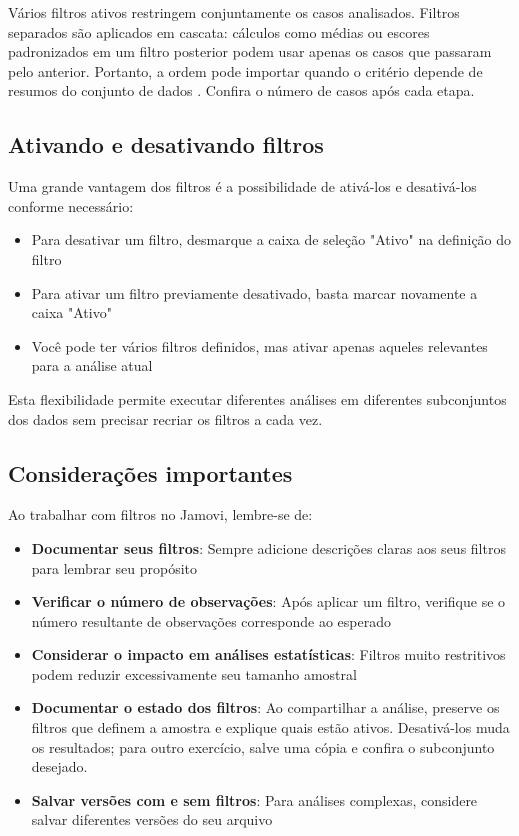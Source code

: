Vários filtros ativos restringem conjuntamente os casos analisados. Filtros separados são aplicados em cascata: cálculos como médias ou escores padronizados em um filtro posterior podem usar apenas os casos que passaram pelo anterior. Portanto, a ordem pode importar quando o critério depende de resumos do conjunto de dados \parencite{JamoviPlanilha}. Confira o número de casos após cada etapa.


\subsection{Ativando e desativando filtros}

Uma grande vantagem dos filtros é a possibilidade de ativá-los e desativá-los conforme necessário:

\begin{itemize}
    \item Para desativar um filtro, desmarque a caixa de seleção "Ativo" na definição do filtro
    \item Para ativar um filtro previamente desativado, basta marcar novamente a caixa "Ativo"
    \item Você pode ter vários filtros definidos, mas ativar apenas aqueles relevantes para a análise atual
\end{itemize}

Esta flexibilidade permite executar diferentes análises em diferentes subconjuntos dos dados sem precisar recriar os filtros a cada vez.

\subsection{Considerações importantes}

Ao trabalhar com filtros no Jamovi, lembre-se de:

\begin{itemize}
    \item \textbf{Documentar seus filtros}: Sempre adicione descrições claras aos seus filtros para lembrar seu propósito
    \item \textbf{Verificar o número de observações}: Após aplicar um filtro, verifique se o número resultante de observações corresponde ao esperado
    \item \textbf{Considerar o impacto em análises estatísticas}: Filtros muito restritivos podem reduzir excessivamente seu tamanho amostral
    \item \textbf{Documentar o estado dos filtros}: Ao compartilhar a análise, preserve os filtros que definem a amostra e explique quais estão ativos. Desativá-los muda os resultados; para outro exercício, salve uma cópia e confira o subconjunto desejado.
    \item \textbf{Salvar versões com e sem filtros}: Para análises complexas, considere salvar diferentes versões do seu arquivo
\end{itemize}


